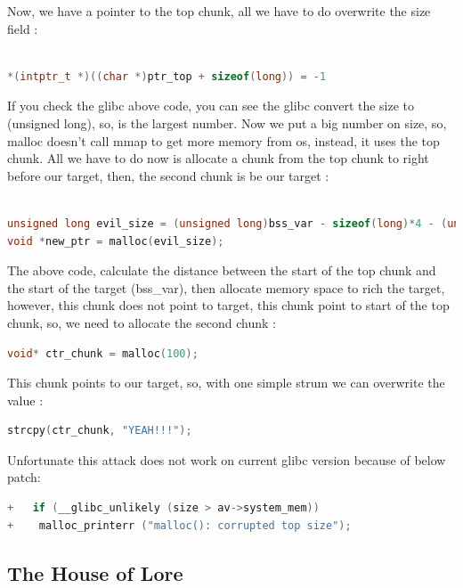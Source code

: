 \documentclass{masterthesis}
\newcommand*\libc{glibc}
\begin{document}
Now, we have a pointer to the top chunk, all we have to do overwrite the size field :
\begin{lstlisting}[language=c,frame=tlrb]

*(intptr_t *)((char *)ptr_top + sizeof(long)) = -1
\end{lstlisting}

If you check the \libc{} above code, you can see the \libc{} convert the size to (unsigned long), so,  is the largest number. Now we put a big number on size, so, malloc doesn’t call mmap to get more memory from os, instead, it uses the top chunk. All we have to do now is allocate a chunk from the top chunk to right before our target, then, the second chunk is be our target :
\begin{lstlisting}[language=c,frame=tlrb]

unsigned long evil_size = (unsigned long)bss_var - sizeof(long)*4 - (unsigned long)ptr_top;
void *new_ptr = malloc(evil_size);
\end{lstlisting}

The above code, calculate the distance between the start of the top chunk and the start of the target (bss\_var), then allocate memory space to rich the target, however, this chunk does not point to target, this chunk point to start of the top chunk, so, we need to allocate the second chunk : 
\begin{lstlisting}[language=c,frame=tlrb]
void* ctr_chunk = malloc(100);
\end{lstlisting}

This chunk points to our target, so, with one simple strum we can overwrite the value :  

\begin{lstlisting}[language=c,frame=tlrb]
strcpy(ctr_chunk, "YEAH!!!");
\end{lstlisting}

Unfortunate this attack does not work on current \libc{} version because of below patch:
\begin{lstlisting}[language=c,frame=tlrb]
+   if (__glibc_unlikely (size > av->system_mem))
+    malloc_printerr ("malloc(): corrupted top size");
\end{lstlisting}
\subsection{The House of Lore}
\end{document}

